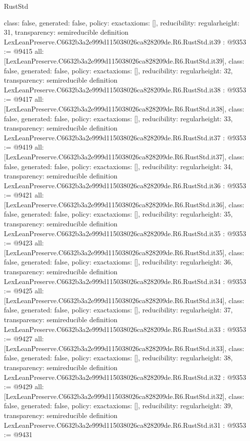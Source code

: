 \begin{lexlean}{RustStd}
\begin{coremodule}
{  class: false,
  generated: false,
  policy: exact{axioms: []},
  reducibility: regular{height: 31},
  transparency: semireducible
}
definition LexLeanPreserve.C6632b3a2e999d115038026ca828209de.R6.RustStd.it39 : @9353 := @9415 {
  all: [LexLeanPreserve.C6632b3a2e999d115038026ca828209de.R6.RustStd.it39],
  class: false,
  generated: false,
  policy: exact{axioms: []},
  reducibility: regular{height: 32},
  transparency: semireducible
}
definition LexLeanPreserve.C6632b3a2e999d115038026ca828209de.R6.RustStd.it38 : @9353 := @9417 {
  all: [LexLeanPreserve.C6632b3a2e999d115038026ca828209de.R6.RustStd.it38],
  class: false,
  generated: false,
  policy: exact{axioms: []},
  reducibility: regular{height: 33},
  transparency: semireducible
}
definition LexLeanPreserve.C6632b3a2e999d115038026ca828209de.R6.RustStd.it37 : @9353 := @9419 {
  all: [LexLeanPreserve.C6632b3a2e999d115038026ca828209de.R6.RustStd.it37],
  class: false,
  generated: false,
  policy: exact{axioms: []},
  reducibility: regular{height: 34},
  transparency: semireducible
}
definition LexLeanPreserve.C6632b3a2e999d115038026ca828209de.R6.RustStd.it36 : @9353 := @9421 {
  all: [LexLeanPreserve.C6632b3a2e999d115038026ca828209de.R6.RustStd.it36],
  class: false,
  generated: false,
  policy: exact{axioms: []},
  reducibility: regular{height: 35},
  transparency: semireducible
}
definition LexLeanPreserve.C6632b3a2e999d115038026ca828209de.R6.RustStd.it35 : @9353 := @9423 {
  all: [LexLeanPreserve.C6632b3a2e999d115038026ca828209de.R6.RustStd.it35],
  class: false,
  generated: false,
  policy: exact{axioms: []},
  reducibility: regular{height: 36},
  transparency: semireducible
}
definition LexLeanPreserve.C6632b3a2e999d115038026ca828209de.R6.RustStd.it34 : @9353 := @9425 {
  all: [LexLeanPreserve.C6632b3a2e999d115038026ca828209de.R6.RustStd.it34],
  class: false,
  generated: false,
  policy: exact{axioms: []},
  reducibility: regular{height: 37},
  transparency: semireducible
}
definition LexLeanPreserve.C6632b3a2e999d115038026ca828209de.R6.RustStd.it33 : @9353 := @9427 {
  all: [LexLeanPreserve.C6632b3a2e999d115038026ca828209de.R6.RustStd.it33],
  class: false,
  generated: false,
  policy: exact{axioms: []},
  reducibility: regular{height: 38},
  transparency: semireducible
}
definition LexLeanPreserve.C6632b3a2e999d115038026ca828209de.R6.RustStd.it32 : @9353 := @9429 {
  all: [LexLeanPreserve.C6632b3a2e999d115038026ca828209de.R6.RustStd.it32],
  class: false,
  generated: false,
  policy: exact{axioms: []},
  reducibility: regular{height: 39},
  transparency: semireducible
}
definition LexLeanPreserve.C6632b3a2e999d115038026ca828209de.R6.RustStd.it31 : @9353 := @9431 {
}
\end{coremodule}
\end{lexlean}
